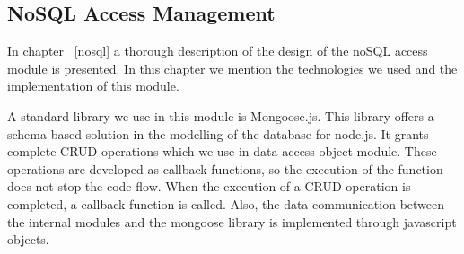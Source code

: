 \subsection{NoSQL Access Management}
In chapter ~\ref{nosql} a thorough description of the design of the noSQL access module is presented. In this chapter we mention the technologies we used and the implementation of this module. \par
	A standard library we use in this module is Mongoose.js. This library offers  a schema based solution in the modelling of the database for node.js. It grants complete CRUD operations which we use in data access object module. These operations are developed as callback functions, so the execution of the function does not stop the code flow. When the execution of a CRUD operation is completed, a callback function is called. Also, the data communication between the internal modules and the mongoose library is implemented through javascript objects.

